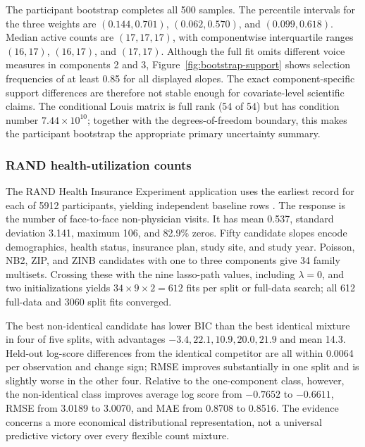 \documentclass[a4paper,fleqn]{cas-sc}
\begin{document}
The participant bootstrap completes all 500 samples. The percentile intervals for the three weights are $(0.144,0.701)$, $(0.062,0.570)$, and $(0.099,0.618)$. Median active counts are $(17,17,17)$, with componentwise interquartile ranges $(16,17)$, $(16,17)$, and $(17,17)$. Although the full fit omits different voice measures in components 2 and 3, Figure~\ref{fig:bootstrap-support} shows selection frequencies of at least 0.85 for all displayed slopes. The exact component-specific support differences are therefore not stable enough for covariate-level scientific claims. The conditional Louis matrix is full rank (54 of 54) but has condition number $7.44\times10^{10}$; together with the degrees-of-freedom boundary, this makes the participant bootstrap the appropriate primary uncertainty summary.

\subsubsection{RAND health-utilization counts}

The RAND Health Insurance Experiment application uses the earliest record for each of 5912 participants, yielding independent baseline rows \citep{deb2002health,cameron2005microeconometrics}. The response is the number of face-to-face non-physician visits. It has mean 0.537, standard deviation 3.141, maximum 106, and 82.9\% zeros. Fifty candidate slopes encode demographics, health status, insurance plan, study site, and study year. Poisson, NB2, ZIP, and ZINB candidates with one to three components give 34 family multisets. Crossing these with the nine lasso-path values, including $\lambda=0$, and two initializations yields $34\times9\times2=612$ fits per split or full-data search; all 612 full-data and 3060 split fits converged.

The best non-identical candidate has lower BIC than the best identical mixture in four of five splits, with advantages $-3.4,22.1,10.9,20.0,21.9$ and mean 14.3. Held-out log-score differences from the identical competitor are all within 0.0064 per observation and change sign; RMSE improves substantially in one split and is slightly worse in the other four. Relative to the one-component class, however, the non-identical class improves average log score from $-0.7652$ to $-0.6611$, RMSE from 3.0189 to 3.0070, and MAE from 0.8708 to 0.8516. The evidence concerns a more economical distributional representation, not a universal predictive victory over every flexible count mixture.
\end{document}
